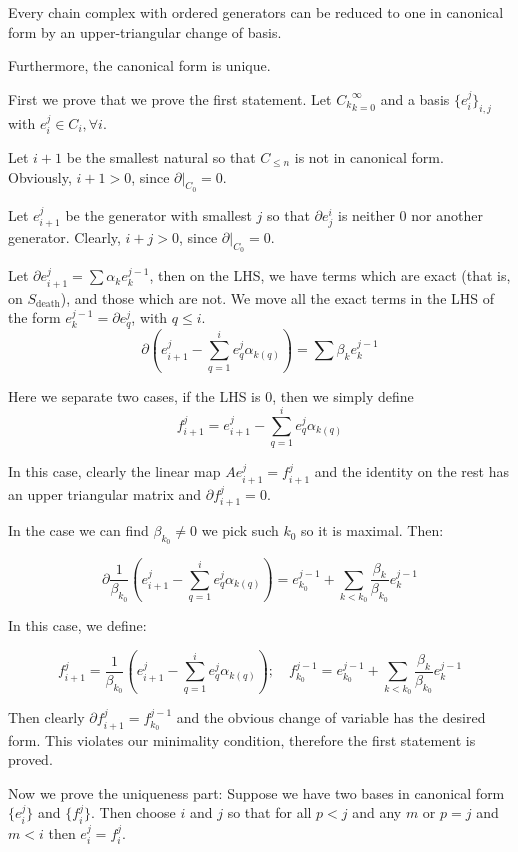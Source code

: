 \begin{theorem}
Every chain complex with ordered generators can be reduced to 
one in canonical form by an upper-triangular change of basis.

Furthermore, the canonical form is unique.
\end{theorem}

\begin{prof}
First we prove that we prove the first statement. 
Let ${C_k}_{k=0}^\infty$ 
and a basis $\{e_i^j\}_{i,j}$ 
with $e_i^j\in C_i,\forall i$.

Let $i+1$ be the smallest natural so that $C_{\leq n}$
is not in canonical form. Obviously, $i+1>0$, since $\partial | _{C_0}=0$.

Let $e_{i+1}^j$ be the generator with smallest $j$ so that $\partial e^i_j$
is neither 0 nor another generator. Clearly, $i+j>0$, since $\partial | _{C_0}=0$.

Let $\partial e_{i+1}^j=\sum \alpha_k e_k^{j-1}$, then on the LHS, we have terms which are exact (that is, on $S_{\text{death}}$),
and those which are not. We move all the exact terms in the LHS of the form $e_{k}^{j-1}=\partial e_{q}^j$, with $q\leq i$.
$$
\partial\left(
e_{i+1}^j
-
\sum_{q=1}^i
e^j_q\alpha_{k(q)}
\right)
=
\sum \beta_k e_k^{j-1}
$$

Here we separate two cases,
if the LHS is $0$, then we simply define 
$$
f^j_{i+1}=
e_{i+1}^j
-
\sum_{q=1}^i
e^j_q\alpha_{k(q)}
$$

In this case, clearly the linear map $A e_{i+1}^j=f_{i+1}^j$ and the identity on the rest 
has an upper triangular matrix and $\partial f^j_{i+1}=0$.

In the case we can find $\beta_{k_0}\neq 0 $ we pick such $k_0$ so it is maximal. Then:

$$
\partial
\frac{1}{\beta_{k_0}}
\left(
e_{i+1}^j
-
\sum_{q=1}^i
e^j_q\alpha_{k(q)}
\right)
=
e_{k_0}^{j-1}
+
\sum_{k<k_0} \frac{\beta_k}{\beta_{k_0}} e_k^{j-1}
$$

In this case, we define:

$$
f_{i+1}^j
=
\frac{1}{\beta_{k_0}}
\left(
e_{i+1}^j
-
\sum_{q=1}^i
e^j_q\alpha_{k(q)}
\right);
\quad
f_{k_{0}}^{j-1}
=
e_{k_0}^{j-1}
+
\sum_{k<k_0} \frac{\beta_k}{\beta_{k_0}} e_k^{j-1}
$$

Then clearly $\partial f^j_{i+1}=f_{k_0}^{j-1}$ and the obvious change of variable has the desired form.
This violates our minimality condition, therefore the first statement is proved.

Now we prove the uniqueness part: Suppose we have two bases in canonical form
$\{e_i^j\}$ and $\{f_i^j\}$. Then choose $i$ and $j$ so that for all $p<j$ and any $m$
or $p=j$ and $m<i$ then $e_i^j=f_i^j$. 


\end{prof}
